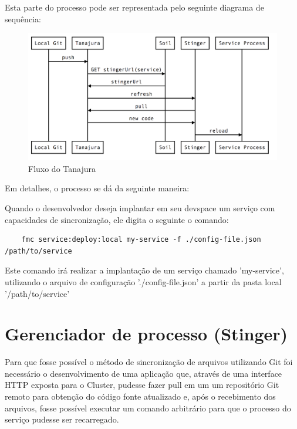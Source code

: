 \documentclass[]{politex}
\begin{document}
	Esta parte do processo pode ser representada pelo seguinte diagrama de sequência:
		\begin{figure}[htb]
			\caption{\label{fig_arquitetura}Fluxo do Tanajura}
			\begin{center}
			\includegraphics[scale=0.20]{tanajura-flow.png}
			\end{center}
		\end{figure}

	Em detalhes, o processo se dá da seguinte maneira:
	
	Quando o desenvolvedor deseja implantar em seu devspace um serviço com capacidades de sincronização, ele digita o seguinte o comando:

	\begin{verbatim}
	fmc service:deploy:local my-service -f ./config-file.json /path/to/service
	\end{verbatim}

	Este comando irá realizar a implantação de um serviço chamado 'my-service', utilizando o arquivo de configuração './config-file.json' a partir da pasta local '/path/to/service'

	\section{Gerenciador de processo (Stinger)}	
	
	Para que fosse possível o método de sincronização de arquivos utilizando Git foi necessário o desenvolvimento de uma aplicação que, através de uma interface HTTP exposta para o Cluster, pudesse fazer pull em um um repositório Git remoto para obtenção do código fonte atualizado e, após o recebimento dos arquivos, fosse possível executar um comando arbitrário para que o processo do serviço pudesse ser recarregado.
	
\end{document}

